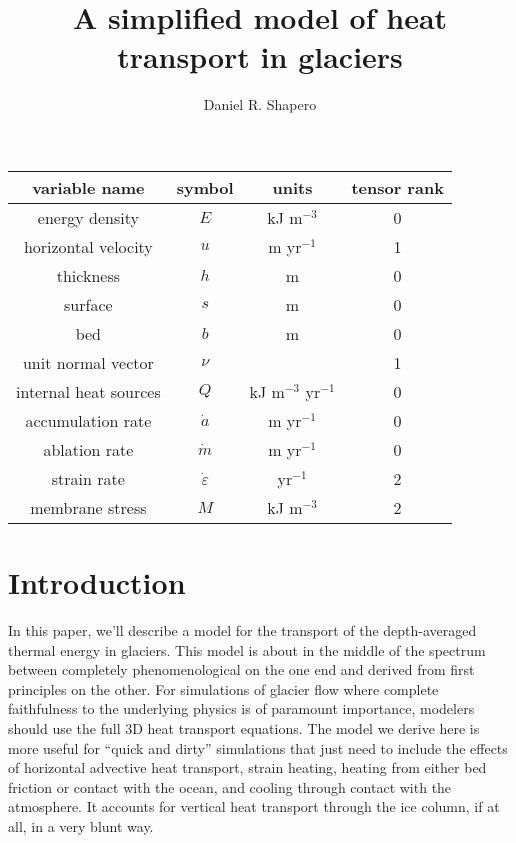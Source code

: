 \documentclass{article}
\title{A simplified model of heat transport in glaciers}
\author{Daniel R. Shapero}
\date{}
\theoremstyle{definition}
\theoremstyle{plain}
\begin{document}
\maketitle

\begin{center}
\begin{tabular}{|c|c|c|c|}
    \hline
    variable name & symbol & units & tensor rank \\
    \hline
    energy density & $E$ & kJ m${}^{-3}$ & 0 \\
    horizontal velocity & $u$ & m yr${}^{-1}$ & 1 \\
    thickness & $h$ & m & 0 \\
    surface & $s$ & m & 0 \\
    bed & $b$ & m & 0 \\
    unit normal vector & $\nu$ & & 1 \\
    internal heat sources & $Q$ & kJ m${}^{-3}$ yr${}^{-1}$ & 0 \\
    accumulation rate & $\dot a$ & m yr${}^{-1}$ & 0 \\
    ablation rate & $\dot m$ & m yr${}^{-1}$ & 0 \\
    strain rate & $\dot\varepsilon$ & yr${}^{-1}$ & 2 \\
    membrane stress & $M$ & kJ m${}^{-3}$ & 2 \\
    \hline
\end{tabular}
\end{center}


\section{Introduction}

In this paper, we'll describe a model for the transport of the depth-averaged thermal energy in glaciers.
This model is about in the middle of the spectrum between completely phenomenological on the one end and derived from first principles on the other.
For simulations of glacier flow where complete faithfulness to the underlying physics is of paramount importance, modelers should use the full 3D heat transport equations.
The model we derive here is more useful for ``quick and dirty'' simulations that just need to include the effects of horizontal advective heat transport, strain heating, heating from either bed friction or contact with the ocean, and cooling through contact with the atmosphere.
It accounts for vertical heat transport through the ice column, if at all, in a very blunt way.
\end{document}
